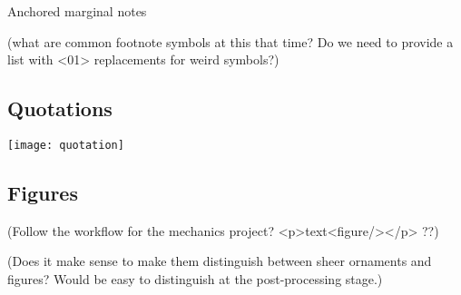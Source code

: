 
Anchored marginal notes

(what are common footnote symbols at this that time? Do we need to provide a list with <01> replacements for weird symbols?)

\subsection{Quotations}

\begin{example}

\texttt{[image: quotation]} 

\end{example}


\subsection{Figures}

(Follow the workflow for the mechanics project? <p>text<figure/></p> ??)

(Does it make sense to make them distinguish between sheer ornaments and figures? Would be easy to distinguish at the post-processing stage.)

